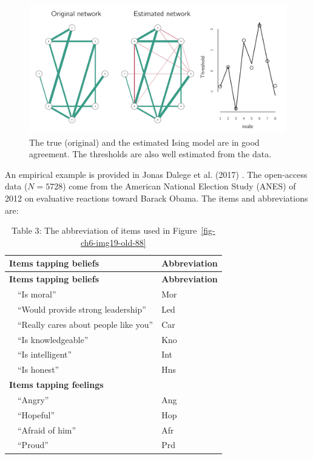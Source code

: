 \documentclass[
  a4paper,
  DIV=11,
  numbers=noendperiod]{scrreprt}
\begin{document}
\begin{figure}

{\centering \includegraphics{media/ch6/fig-ch6-img18-old-87.png}

}

\caption{\label{fig-ch6-img18-old-87}The true (original) and the
estimated Ising model are in good agreement. The thresholds are also
well estimated from the data.}

\end{figure}

An empirical example is provided in Jonas Dalege et al. (2017) . The
open-access data (\(N = 5728\)) come from the American National Election
Study (ANES) of 2012 on evaluative reactions toward Barack Obama. The
items and abbreviations are:

\begin{longtable}[]{@{}ll@{}}
\caption{Table 3: The abbreviation of items used in
Figure~\ref{fig-ch6-img19-old-88}}\tabularnewline
\toprule\noalign{}
\textbf{Items tapping beliefs} & \textbf{Abbreviation} \\
\midrule\noalign{}
\endfirsthead
\toprule\noalign{}
\textbf{Items tapping beliefs} & \textbf{Abbreviation} \\
\midrule\noalign{}
\endhead
\bottomrule\noalign{}
\endlastfoot
 ``Is moral'' & Mor \\
 ``Would provide strong leadership'' & Led \\
 ``Really cares about people like you'' & Car \\
 ``Is knowledgeable'' & Kno \\
 ``Is intelligent'' & Int \\
 ``Is honest'' & Hns \\
\textbf{Items tapping feelings} & \\
 ``Angry'' & Ang \\
 ``Hopeful'' & Hop \\
 ``Afraid of him'' & Afr \\
 ``Proud'' & Prd \\
\end{longtable}
\end{document}
